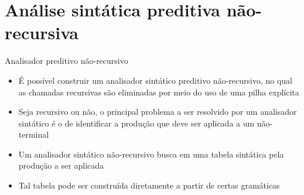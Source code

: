 \section{Análise sintática preditiva não-recursiva}

\begin{frame}[fragile]{Analisador preditivo não-recursivo}

    \begin{itemize}
        \item É possível construir um analisador sintático preditivo não-recursivo, no qual as chamadas recursivas são eliminadas por meio do uso de uma
            pilha explícita

        \item Seja recursivo ou não, o principal problema a ser resolvido por um analisador sintático é o de identificar a produção que deve ser aplicada a
            um não-terminal

        \item Um analisador sintático não-recursivo busca em uma tabela sintática pela produção a ser aplicada

        \item Tal tabela pode ser construída diretamente a partir de certas gramáticas
    \end{itemize}

\end{frame}

